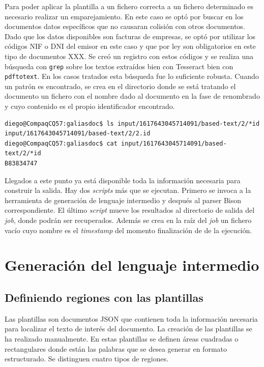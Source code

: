 
Para poder aplicar la plantilla a un fichero correcta a un fichero determinado es necesario realizar un emparejamiento. En este caso se optó por buscar en los documentos datos específicos que no causaran colisión con otros documentos. Dado que los datos disponibles son facturas de empresas, se optó por utilizar los códigos NIF o DNI del emisor en este caso y que por ley son obligatorios en este tipo de documentos XXX. Se creó un registro con estos códigos y se realiza una búsqueda con \verb|grep| sobre los textos extraídos bien con Tesseract bien con \verb|pdftotext|. En los casos tratados esta búsqueda fue lo suficiente robusta.
Cuando un patrón es encontrado, se crea en el directorio donde se está tratando el documento un fichero con el nombre dado al documento en la fase de renombrado y cuyo contenido es el propio identificador encontrado.

\begin{verbatim}
diego@CompaqCQ57:galiasdoc$ ls input/1617643045714091/based-text/2/*id
input/1617643045714091/based-text/2/2.id
diego@CompaqCQ57:galiasdoc$ cat input/1617643045714091/based-text/2/*id
B83834747
\end{verbatim}

Llegados a este punto ya está disponible toda la información necesaria para construir la salida. Hay dos \emph{scripts} más que se ejecutan. Primero se invoca a la herramienta de generación de lenguaje intermedio y después al parser Bison correspondiente. El último \emph{script} mueve los resultados al directorio de salida del \emph{job}, donde podrán ser recuperados. Además se crea en la raíz del \emph{job} un fichero vacío cuyo nombre es el \emph{timestamp} del momento finalización de de la ejecución.

\section{Generación del lenguaje intermedio}

\subsection{Definiendo regiones con las plantillas}

Las plantillas son documentos JSON que contienen toda la información necesaria para localizar el texto de interés del documento. La creación de las plantillas se ha realizado manualmente. En estas plantillas se definen áreas cuadradas o rectangulares donde están las palabras que se desea generar en formato estructurado. Se distinguen cuatro tipos de regiones.

